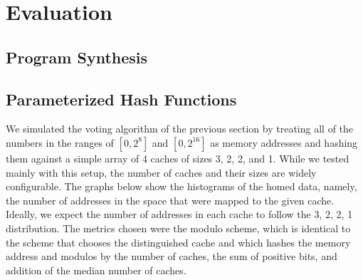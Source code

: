 \section{Evaluation}
\label{sec:Eval}

\subsection{Program Synthesis}

\subsection{Parameterized Hash Functions}

We simulated the voting algorithm of the previous section by treating all of the
numbers in the ranges of $[0, 2^{8}]$ and $[0, 2^{16}]$ as memory addresses and
hashing them against a simple array of 4 caches of sizes 3, 2, 2, and 1.  While
we tested mainly with this setup, the number of caches and their sizes are
widely configurable.  The graphs below show the histograms of the homed data,
namely, the number of addresses in the space that were mapped to the given
cache.  Ideally, we expect the number of addresses in each cache to follow the
3, 2, 2, 1 distribution.  The metrics chosen were the modulo scheme, which is
identical to the scheme that chooses the distinguished cache and which hashes
the memory address and modulos by the number of caches, the sum of positive
bits, and addition of the median number of caches.


